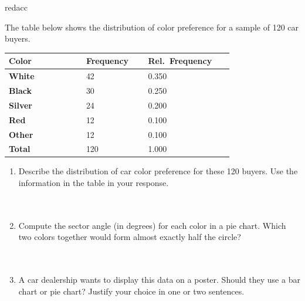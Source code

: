 \documentclass[10pt]{article}
\begin{document}
\vspace{0.14in}

\begin{blurbbox}{redacc}
\small

The table below shows the distribution of color preference for a sample of
120 car buyers.

\vspace{8pt}
\renewcommand{\arraystretch}{1.6}
\begin{tabularx}{0.72\linewidth}{@{} >{\bfseries}p{0.28\linewidth}
                                      C{0.22\linewidth}
                                      C{0.26\linewidth} @{}}
\textbf{Color} & \textbf{Frequency} & \textbf{Rel.\ Frequency} \\
\midrule
White   & 42 & 0.350 \\
Black   & 30 & 0.250 \\
Silver  & 24 & 0.200 \\
Red     & 12 & 0.100 \\
Other   & 12 & 0.100 \\
\midrule
{}\textbf{Total} & 120 & 1.000 \\
\end{tabularx}

\vspace{10pt}

\begin{enumerate}[leftmargin=1.5em, itemsep=10pt]
  \item Describe the distribution of car color preference for these 120 buyers.
        Use the information in the table in your response.\\[6pt]
        \writeline\\[1pt]\writeline\\[1pt]\writeline

  \item Compute the sector angle (in degrees) for each color in a pie chart.
        Which two colors together would form almost exactly half the circle?\\[8pt]
        \writeline\\[1pt]\writeline\\[1pt]\writeline

  \item A car dealership wants to display this data on a poster. Should they
        use a bar chart or pie chart? Justify your choice in one or two sentences.\\[6pt]
        \writeline\\[1pt]\writeline
\end{enumerate}

\end{blurbbox}
\end{document}
